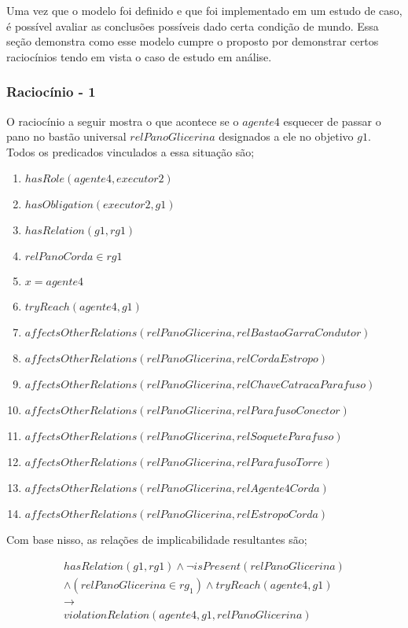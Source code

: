 \label{racs}

Uma vez que o modelo foi definido e que foi implementado em um estudo de caso, é possível avaliar as conclusões possíveis dado certa condição de mundo. Essa seção demonstra 
como esse modelo cumpre o proposto por demonstrar certos raciocínios tendo em vista o caso de estudo em análise. 

\subsubsection{Raciocínio - 1} 


O raciocínio a seguir mostra o que acontece se o $agente4$ esquecer de passar o pano no bastão universal $relPanoGlicerina$ designados a ele no objetivo $g1$. 
Todos os predicados vinculados a essa situação são;

\begin{enumerate}
	\item $hasRole(agente4,executor2)$ 
	\item $hasObligation(executor2,g1)$
	\item $hasRelation(g1,rg1)$ 
	\item $relPanoCorda \in rg1$
	\item $ x = agente4 $
	\item $tryReach(agente4,g1)$
	\item $affectsOtherRelations(relPanoGlicerina,relBastaoGarraCondutor)$
	\item $affectsOtherRelations(relPanoGlicerina,relCordaEstropo)$  
	\item $affectsOtherRelations(relPanoGlicerina,relChaveCatracaParafuso)$
	\item $affectsOtherRelations(relPanoGlicerina,relParafusoConector)$ 
	\item $affectsOtherRelations(relPanoGlicerina,relSoqueteParafuso)$ 
	\item $affectsOtherRelations(relPanoGlicerina,relParafusoTorre)$
	\item $affectsOtherRelations(relPanoGlicerina,relAgente4Corda)$ 
	\item $affectsOtherRelations(relPanoGlicerina,relEstropoCorda)$	
\end{enumerate}

Com base nisso, as relações de implicabilidade resultantes são;

\begin{eqnarray}\nonumber
	hasRelation(g1,rg1)\wedge \neg isPresent(relPanoGlicerina)  \nonumber \\ 
	\wedge (relPanoGlicerina\in rg_1) \wedge tryReach(agente4,g1) \nonumber \\ 
	\to \nonumber \\ 
	violationRelation(agente4,g1,relPanoGlicerina) \nonumber \\	
\end{eqnarray}


